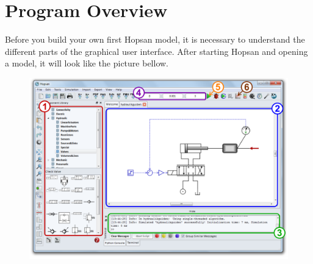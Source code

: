 \documentclass[a4paper]{article}
\begin{document}

\section*{Program Overview}
Before you build your own first Hopsan model, it is necessary to understand the different parts of the graphical user interface. After starting Hopsan and opening a model, it will look like the picture bellow.  

\begin{figure}[ht]
\includegraphics[width=\textwidth]{gfx/screenshot.pdf}
\end{figure}
\end{document}
